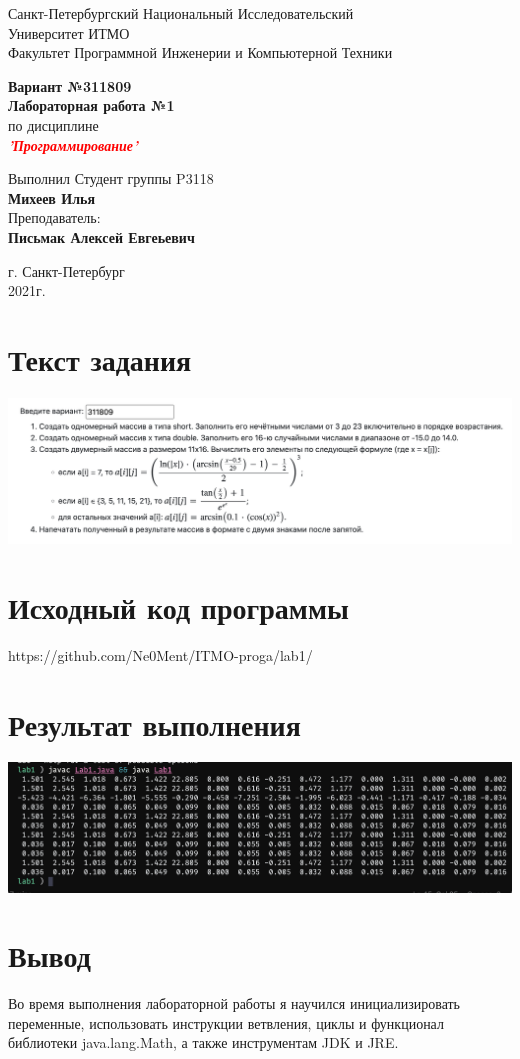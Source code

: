 \documentclass[12pt,onecolumn]{article}
\begin{document}
\begin{center}
    Санкт-Петербургский Национальный Исследовательский\\ 
    Университет ИТМО\\
    Факультет Программной Инженерии и Компьютерной Техники\\
\end{center}
\vspace{1cm}


\begin{center}
    \large \textbf{Вариант №311809}\\
    \textbf{Лабораторная работа №1}\\
    по дисциплине\\
    \textbf{\textcolor{red}{\textit{'Программирование'}}}
\end{center}

\vspace{2cm}

\begin{flushright}
  Выполнил Студент  группы P3118\\
  \textbf{Михеев Илья}\\
  Преподаватель: \\
  \textbf{Письмак Алексей Евгеьевич}\\
\end{flushright}

\vspace{6cm}
\begin{center}
    г. Санкт-Петербург\\
    2021г.
\end{center}

\newpage
\section{Текст задания}
\includegraphics{task.png}

\section{Исходный код программы}
https://github.com/Ne0Ment/ITMO-proga/lab1/

\section{Результат выполнения}
\includegraphics{result.png}

\section{Вывод}
Во время выполнения лабораторной работы я научился инициализировать переменные, использовать инструкции ветвления, циклы и функционал библиотеки java.lang.Math, а также инструментам JDK и JRE.
\end{document}
